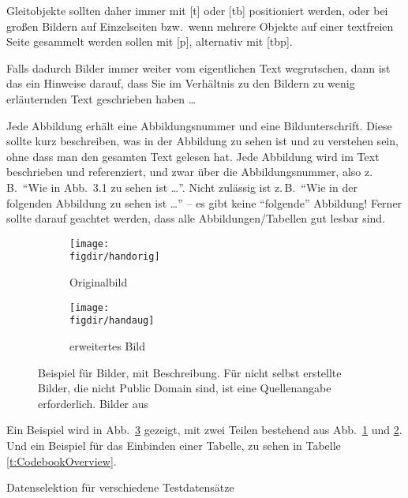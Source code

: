 \begin{shaded*}
Gleitobjekte sollten daher immer mit [t] oder [tb] positioniert werden, oder bei großen Bildern auf Einzelseiten bzw.\ wenn mehrere Objekte auf einer textfreien Seite gesammelt werden sollen mit [p], alternativ mit [tbp].
\end{shaded*}

Falls dadurch Bilder immer weiter vom eigentlichen Text wegrutschen, dann ist das ein Hinweise darauf, dass Sie im Verhältnis zu den Bildern zu wenig erläuternden Text geschrieben haben \dots

Jede Abbildung erhält eine Abbildungsnummer und eine Bildunterschrift.
Diese sollte kurz beschreiben, was in der Abbildung zu sehen ist und zu verstehen sein, ohne dass man den gesamten Text gelesen hat.
Jede Abbildung wird im Text beschrieben und referenziert, und zwar über die Abbildungsnummer, also z.\,B.\  "`Wie in Abb.\ 3.1 zu sehen ist \dots"'.
Nicht zulässig ist z.\,B.\ "`Wie in der folgenden Abbildung zu sehen ist \dots"' -- es gibt keine "`folgende"' Abbildung!
Ferner sollte darauf geachtet werden, dass alle Abbildungen/Tabellen gut lesbar sind.


\begin{figure}[t]
\centering

\begin{subfigure}{0.35\linewidth}
\centering
\texttt{[image: \\figdir/handorig]}
\caption{Originalbild}
\label{FIG:arexorig}
\end{subfigure}
\hspace{1cm}
\begin{subfigure}{0.35\linewidth}
\centering
\texttt{[image: \\figdir/handaug]}
\caption{erweitertes Bild}
\label{FIG:arexaugm}
\end{subfigure}
%
\caption[AR Beispiel]
{Beispiel für Bilder, mit Beschreibung. Für nicht selbst erstellte Bilder, die nicht Public Domain sind, ist eine Quellenangabe erforderlich. Bilder aus \cite{Schmidt01:PAO}}
\label{FIG:arex}
\end{figure}

Ein Beispiel wird in Abb.\ \ref{FIG:arex} gezeigt, mit zwei Teilen  bestehend aus Abb.\ \ref{FIG:arexorig} und \ref{FIG:arexaugm}.
Und ein Beispiel für das Einbinden einer Tabelle, zu sehen in Tabelle \ref{t:CodebookOverview}.

\begin{table}[t]
\centering\small
 \caption[Testtabelle]{Datenselektion für verschiedene Testdatensätze}
  \label{t:CodebookOverview}

\end{table}

